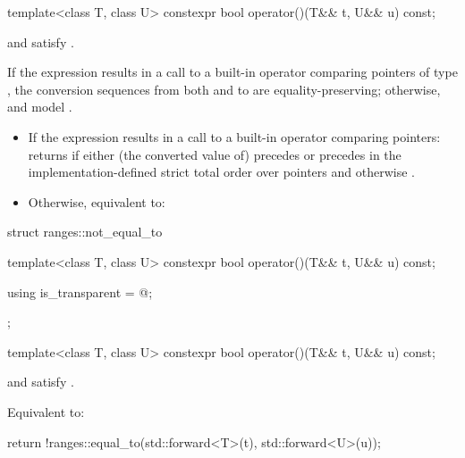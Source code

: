 \begin{itemdecl}
template<class T, class U>
  constexpr bool operator()(T&& t, U&& u) const;
\end{itemdecl}

\begin{itemdescr}
\pnum
\constraints
{} and  satisfy .

\pnum
\expects
If the expression 
results in a call to a built-in operator \tcode{==} comparing pointers of type
, the conversion sequences from both  and  to 
are equality-preserving;
otherwise,  and  model .

\pnum
\effects
\begin{itemize}
\item
  If the expression  results in
  a call to a built-in operator \tcode{==} comparing pointers:
  returns  if either (the converted value of)  precedes
   or  precedes  in the implementation-defined strict
  total order over pointers and otherwise .

\item
  Otherwise, equivalent to:
\end{itemize}
\end{itemdescr}

%
\begin{codeblock}
struct ranges::not_equal_to {
  template<class T, class U>
    constexpr bool operator()(T&& t, U&& u) const;

  using is_transparent = @\unspecnc@;
};
\end{codeblock}

\begin{itemdecl}
template<class T, class U>
  constexpr bool operator()(T&& t, U&& u) const;
\end{itemdecl}

\begin{itemdescr}
\pnum
\constraints
{} and  satisfy .

\pnum
\effects
Equivalent to:
\begin{codeblock}
return !ranges::equal_to{}(std::forward<T>(t), std::forward<U>(u));
\end{codeblock}
\end{itemdescr}

